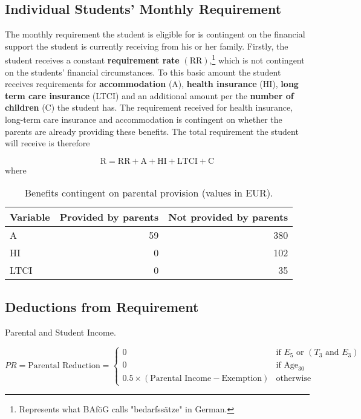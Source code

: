\subsection{Individual Students' Monthly Requirement}
The monthly requirement the student is eligible for is contingent on the financial support 
the student is currently receiving from his or her family. 
Firstly, the student receives a constant \textbf{requirement rate} \( (\text{RR})  \),\footnote{Represents what BAföG calls "bedarfssätze" in German.} which is not contingent on the students' financial 
circumstances. To this basic amount the student receives requirements for \textbf{accommodation} (A), 
\textbf{health insurance} (HI), \textbf{long term care insurance} (LTCI) and an additional amount per the 
\textbf{number of children} (C) the student has. 
The requirement received for health insurance, long-term care insurance and accommodation is contingent on 
whether the parents are already providing these benefits. 
The total requirement the student will receive is therefore 

\begin{equation} \label{eq:total-requirement}
  \text{R} = \text{RR}  + \text{A} + \text{HI} + \text{LTCI} + \text{C}
\end{equation}
where
\begin{table}[H]
\small
\centering
  \begin{tabular}{lrr}
  \hline
  Variable & Provided by parents & Not provided by parents \\
  \hline
  A & 59 & 380 \\
  HI & 0 & 102 \\
  LTCI & 0 & 35 \\
  \hline
  \end{tabular}
\caption{Benefits contingent on parental provision (values in EUR).}
\end{table}



\subsection{Deductions from Requirement}
Parental and Student Income.

\begin{equation} \label{eq:parental-reduction}
  PR = \text{Parental Reduction} = 
  \begin{cases}
    0 & \text{if } E_5 \text{ or } (T_3 \text{ and } E_3) \\
    0 & \text{if } \text{Age}_{30} \\
    0.5 \times (\text{Parental Income} - \text{Exemption}) & \text{otherwise}
  \end{cases}
\end{equation}

